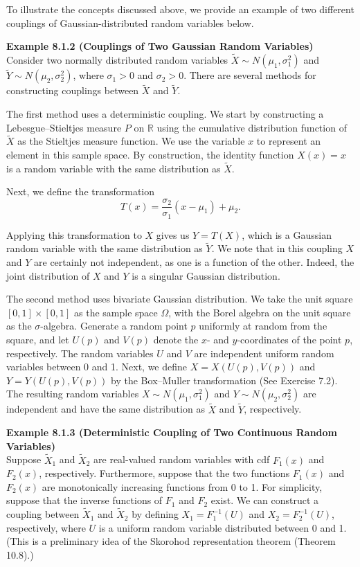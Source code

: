 To illustrate the concepts discussed above, we provide an example of two different couplings of Gaussian-distributed random variables below.

\textbf{Example 8.1.2 (Couplings of Two Gaussian Random Variables)} \\
Consider two normally distributed random variables $\tilde{X}\sim N(\mu_1,\sigma_1^2)$ and $\tilde{Y}\sim N(\mu_2,\sigma_2^2)$, where $\sigma_1>0$ and $\sigma_2>0$. There are several methods for constructing couplings between $\tilde{X}$ and $\tilde{Y}$.

The first method uses a deterministic coupling. We start by constructing a Lebesgue--Stieltjes measure $P$ on $\mathbb{R}$ using the cumulative distribution function of $\tilde{X}$ as the Stieltjes measure function. We use the variable $x$ to represent an element in this sample space. By construction, the identity function $X(x)=x$ is a random variable with the same distribution as $\tilde{X}$.

Next, we define the transformation
\begin{equation}
T(x)=\frac{\sigma_2}{\sigma_1}(x-\mu_1)+\mu_2.
\tag{8.1}
\end{equation}

Applying this transformation to $X$ gives us $Y=T(X)$, which is a Gaussian random variable with the same distribution as $\tilde{Y}$. We note that in this coupling $X$ and $Y$ are certainly not independent, as one is a function of the other. Indeed, the joint distribution of $X$ and $Y$ is a singular Gaussian distribution.

The second method uses bivariate Gaussian distribution. We take the unit square $[0,1]\times [0,1]$ as the sample space $\Omega$, with the Borel algebra on the unit square as the $\sigma$-algebra. Generate a random point $p$ uniformly at random from the square, and let $U(p)$ and $V(p)$ denote the $x$- and $y$-coordinates of the point $p$, respectively. The random variables $U$ and $V$ are independent uniform random variables between 0 and 1. Next, we define $X=X(U(p),V(p))$ and $Y=Y(U(p),V(p))$ by the Box--Muller transformation (See Exercise 7.2). The resulting random variables $X\sim N(\mu_1,\sigma_1^2)$ and $Y\sim N(\mu_2,\sigma_2^2)$ are independent and have the same distribution as $\tilde{X}$ and $\tilde{Y}$, respectively.

\textbf{Example 8.1.3 (Deterministic Coupling of Two Continuous Random Variables)} \\
Suppose $\tilde{X}_1$ and $\tilde{X}_2$ are real-valued random variables with cdf $F_1(x)$ and $F_2(x)$, respectively. Furthermore, suppose that the two functions $F_1(x)$ and $F_2(x)$ are monotonically increasing functions from 0 to 1. For simplicity, suppose that the inverse functions of $F_1$ and $F_2$ exist. We can construct a coupling between $\tilde{X}_1$ and $\tilde{X}_2$ by defining $X_1=F_1^{-1}(U)$ and $X_2=F_2^{-1}(U)$, respectively, where $U$ is a uniform random variable distributed between 0 and 1. (This is a preliminary idea of the Skorohod representation theorem (Theorem 10.8).)

